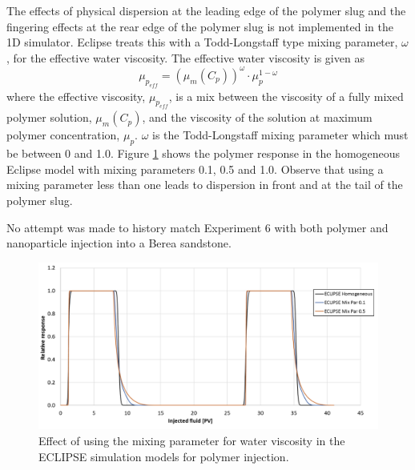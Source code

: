 The effects of physical dispersion at the leading edge of the polymer slug and the fingering effects at the rear edge of the polymer slug is not implemented in the 1D simulator. Eclipse treats this with a Todd-Longstaff type mixing parameter,  $\omega$, for the effective water viscosity. The effective water viscosity is given as
\begin{equation}
    \mu_{p_\textit{eff}} = (\mu_m(C_p))^\omega \cdot \mu_p^{1-\omega}
\end{equation}
where the effective viscosity,  $\mu_{p_\textit{eff}}$, is a mix between the viscosity of a fully mixed polymer solution,  $\mu_m(C_p)$, and the viscosity of the solution at maximum polymer concentration,  $\mu_p$.  $\omega$ is the Todd-Longstaff mixing parameter which must be between 0 and 1.0. Figure \ref{cht:simEclMix} shows the polymer response in the homogeneous Eclipse model with mixing parameters 0.1, 0.5 and 1.0. Observe that using a mixing parameter less than one leads to dispersion in front and at the tail of the polymer slug.

No attempt was made to history match Experiment 6 with both polymer and nanoparticle injection into a Berea sandstone.

\begin{figure}
    \centering
    \includegraphics[width=\textwidth]{img/cht/simEclMix.png}
    \caption{Effect of using the mixing parameter for water viscosity in the ECLIPSE simulation models for polymer injection. }
    \label{cht:simEclMix}
\end{figure}

